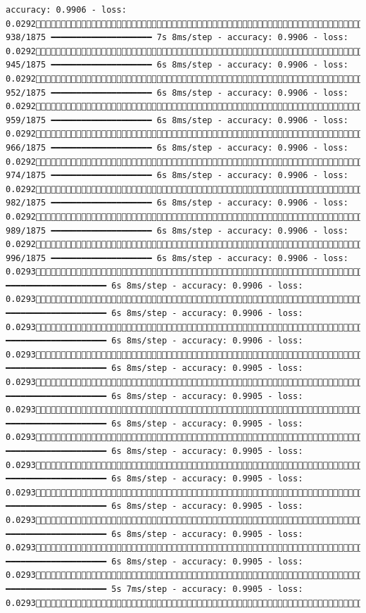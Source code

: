 \documentclass[
  letterpaper,
  DIV=11,
  numbers=noendperiod]{scrreprt}
\begin{document}
\begin{verbatim}
accuracy: 0.9906 - loss: 0.0292 938/1875 ━━━━━━━━━━━━━━━━━━━━ 7s 8ms/step - accuracy: 0.9906 - loss: 0.0292 945/1875 ━━━━━━━━━━━━━━━━━━━━ 6s 8ms/step - accuracy: 0.9906 - loss: 0.0292 952/1875 ━━━━━━━━━━━━━━━━━━━━ 6s 8ms/step - accuracy: 0.9906 - loss: 0.0292 959/1875 ━━━━━━━━━━━━━━━━━━━━ 6s 8ms/step - accuracy: 0.9906 - loss: 0.0292 966/1875 ━━━━━━━━━━━━━━━━━━━━ 6s 8ms/step - accuracy: 0.9906 - loss: 0.0292 974/1875 ━━━━━━━━━━━━━━━━━━━━ 6s 8ms/step - accuracy: 0.9906 - loss: 0.0292 982/1875 ━━━━━━━━━━━━━━━━━━━━ 6s 8ms/step - accuracy: 0.9906 - loss: 0.0292 989/1875 ━━━━━━━━━━━━━━━━━━━━ 6s 8ms/step - accuracy: 0.9906 - loss: 0.0292 996/1875 ━━━━━━━━━━━━━━━━━━━━ 6s 8ms/step - accuracy: 0.9906 - loss: 0.02931003/1875 ━━━━━━━━━━━━━━━━━━━━ 6s 8ms/step - accuracy: 0.9906 - loss: 0.02931010/1875 ━━━━━━━━━━━━━━━━━━━━ 6s 8ms/step - accuracy: 0.9906 - loss: 0.02931017/1875 ━━━━━━━━━━━━━━━━━━━━ 6s 8ms/step - accuracy: 0.9906 - loss: 0.02931024/1875 ━━━━━━━━━━━━━━━━━━━━ 6s 8ms/step - accuracy: 0.9905 - loss: 0.02931031/1875 ━━━━━━━━━━━━━━━━━━━━ 6s 8ms/step - accuracy: 0.9905 - loss: 0.02931039/1875 ━━━━━━━━━━━━━━━━━━━━ 6s 8ms/step - accuracy: 0.9905 - loss: 0.02931046/1875 ━━━━━━━━━━━━━━━━━━━━ 6s 8ms/step - accuracy: 0.9905 - loss: 0.02931053/1875 ━━━━━━━━━━━━━━━━━━━━ 6s 8ms/step - accuracy: 0.9905 - loss: 0.02931060/1875 ━━━━━━━━━━━━━━━━━━━━ 6s 8ms/step - accuracy: 0.9905 - loss: 0.02931067/1875 ━━━━━━━━━━━━━━━━━━━━ 6s 8ms/step - accuracy: 0.9905 - loss: 0.02931075/1875 ━━━━━━━━━━━━━━━━━━━━ 6s 8ms/step - accuracy: 0.9905 - loss: 0.02931082/1875 ━━━━━━━━━━━━━━━━━━━━ 5s 7ms/step - accuracy: 0.9905 - loss: 0.02931089/1875 
\end{verbatim}
\end{document}
